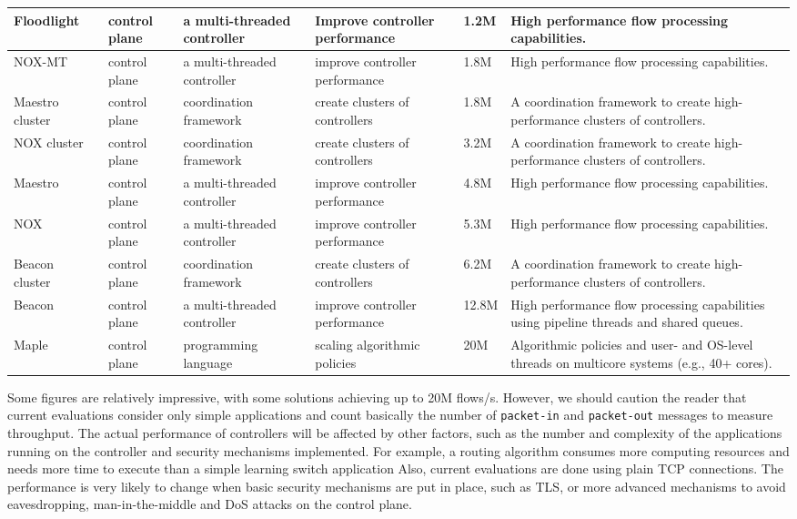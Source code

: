 {\begin{table}[!htp]
\begin{center}
\begin{tabularx}{\linewidth}{p{1.9cm}p{1.6cm}p{2.8cm}p{2.5cm}p{1.0cm}X}
Floodlight~\cite{erickson2013} & control plane & a multi-threaded controller & Improve controller performance & 1.2M & High performance flow processing capabilities. \\\hline
NOX-MT~\cite{tootoonchian2012} & control plane & a multi-threaded controller & improve controller performance & 1.8M & High performance flow processing capabilities. \\\hline
Maestro cluster~\cite{yazici2012} & control plane & coordination framework & create clusters of controllers & 1.8M & A coordination framework to create high-performance clusters of controllers. \\\hline
NOX cluster~\cite{yazici2012} & control plane & coordination framework & create clusters of controllers & 3.2M & A coordination framework to create high-performance clusters of controllers. \\\hline
Maestro~\cite{cai2011} & control plane & a multi-threaded controller & improve controller performance & 4.8M & High performance flow processing capabilities. \\\hline
NOX~\cite{erickson2013} & control plane & a multi-threaded controller & improve controller performance & 5.3M & High performance flow processing capabilities. \\\hline
Beacon cluster~\cite{yazici2012} & control plane & coordination framework & create clusters of controllers & 6.2M & A coordination framework to create high-performance clusters of controllers. \\\hline
Beacon~\cite{erickson2013} & control plane & a multi-threaded controller & improve controller performance & 12.8M & High performance flow processing capabilities using pipeline threads and shared queues. \\\hline
Maple~\cite{voellmy2013} & control plane & programming language & scaling algorithmic policies & 20M & Algorithmic policies and user- and OS-level threads on multicore systems (e.g., 40+ cores). \\\hline
\end{tabularx}
\end{center}
\end{table}
}


Some figures are relatively impressive, with some solutions achieving up to 20M flows/s. 
However, we should caution the reader that current evaluations consider only simple applications and count basically the number of \texttt{packet-in} and \texttt{packet-out} messages to measure throughput. 
The actual performance of controllers will be affected by other factors, such as the number and complexity of the applications running on the controller and security mechanisms implemented.
For example, a routing algorithm consumes more computing resources and needs more time to execute than a simple learning switch application
Also, current evaluations are done using plain TCP connections.
The performance is very likely to change when basic security mechanisms are put in place, such as TLS, or more advanced mechanisms to avoid eavesdropping, man-in-the-middle and DoS attacks on the control plane.

